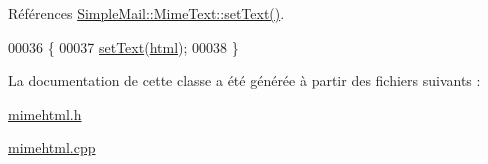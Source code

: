 Références \hyperlink{class_simple_mail_1_1_mime_text_ad7ebe9a3a94fd26b287bed8e228b09e4}{Simple\+Mail\+::\+Mime\+Text\+::set\+Text()}.


\begin{DoxyCode}
00036 \{
00037     \hyperlink{class_simple_mail_1_1_mime_text_ad7ebe9a3a94fd26b287bed8e228b09e4}{setText}(\hyperlink{class_simple_mail_1_1_mime_html_a842b4cadf1faecfbe442cd829aa66cbb}{html});
00038 \}
\end{DoxyCode}


La documentation de cette classe a été générée à partir des fichiers suivants \+:\begin{DoxyCompactItemize}
\item 
\hyperlink{mimehtml_8h}{mimehtml.\+h}\item 
\hyperlink{mimehtml_8cpp}{mimehtml.\+cpp}\end{DoxyCompactItemize}
